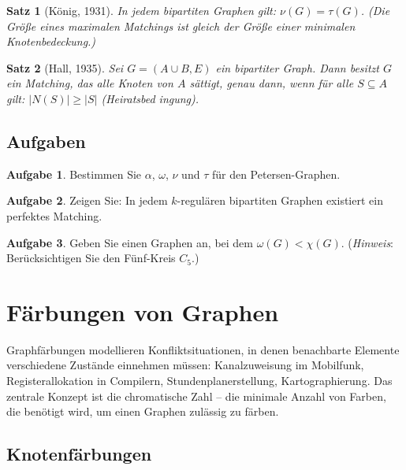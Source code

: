 ﻿\documentclass[a4paper,12pt,openany,oneside]{book}
\theoremstyle{definition}
\newtheorem{aufgabe}{Aufgabe}[chapter]
\theoremstyle{plain}
\newtheorem{satz}{Satz}[chapter]
\theoremstyle{remark}
\begin{document}
\begin{satz}[K\"onig, 1931]
  In jedem bipartiten Graphen gilt: $\nu(G) = \tau(G)$.
  (Die Gr\"o\ss{}e eines maximalen Matchings ist gleich der Gr\"o\ss{}e
  einer minimalen Knotenbedeckung.)
\end{satz}

\begin{satz}[Hall, 1935]
  Sei $G = (A \cup B, E)$ ein bipartiter Graph. Dann besitzt $G$ ein Matching,
  das alle Knoten von $A$ s\"attigt, genau dann, wenn f\"ur alle
  $S \subseteq A$ gilt: $|N(S)| \geq |S|$ (Heiratsbed ingung).
\end{satz}

\section{Aufgaben}

\begin{aufgabe}
  Bestimmen Sie $\alpha$, $\omega$, $\nu$ und $\tau$ f\"ur den
  Petersen-Graphen.
\end{aufgabe}

\begin{aufgabe}
  Zeigen Sie: In jedem $k$-regul\"aren bipartiten Graphen existiert ein
  perfektes Matching.
\end{aufgabe}

\begin{aufgabe}
  Geben Sie einen Graphen an, bei dem $\omega(G) < \chi(G)$.
  (\emph{Hinweis}: Ber\"ucksichtigen Sie den F\"unf-Kreis $C_5$.)
\end{aufgabe}

\chapter{F\"arbungen von Graphen}

Graphf\"arbungen modellieren Konfliktsituationen, in denen benachbarte
Elemente verschiedene Zust\"ande einnehmen m\"ussen: Kanalzuweisung im
Mobilfunk, Registerallokation in Compilern, Stundenplanerstellung,
Kartographierung. Das zentrale Konzept ist die chromatische Zahl -- die
minimale Anzahl von Farben, die ben\"otigt wird, um einen Graphen zul\"assig
zu f\"arben.

\section{Knotenf\"arbungen}
\end{document}
